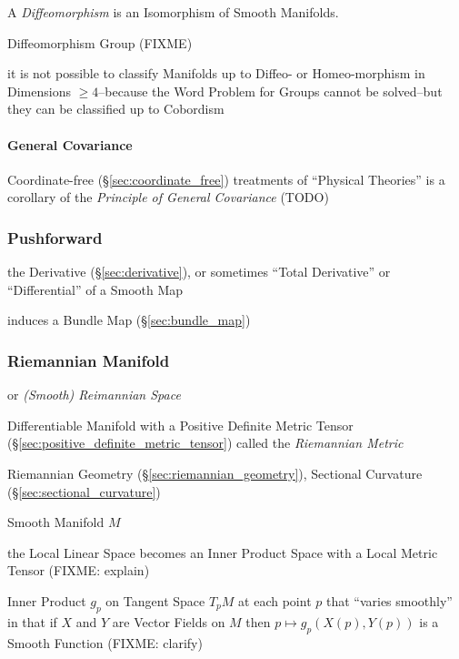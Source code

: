 A \emph{Diffeomorphism} is an Isomorphism of Smooth Manifolds.

Diffeomorphism Group (FIXME)

it is not possible to classify Manifolds up to Diffeo- or Homeo-morphism in
Dimensions $\geq 4$--because the Word Problem for Groups cannot be solved--but
they can be classified up to Cobordism




\paragraph{General Covariance}\label{sec:general_covariance}\hfill

Coordinate-free (\S\ref{sec:coordinate_free}) treatments of ``Physical
Theories'' is a corollary of the \emph{Principle of General Covariance} (TODO)



\subsubsection{Pushforward}\label{sec:pushforward}

the Derivative (\S\ref{sec:derivative}), or sometimes ``Total Derivative'' or
``Differential'' of a Smooth Map

induces a Bundle Map (\S\ref{sec:bundle_map})



\subsubsection{Riemannian Manifold}\label{sec:riemannian_manifold}


or \emph{(Smooth) Reimannian Space}

Differentiable Manifold with a Positive Definite Metric Tensor
(\S\ref{sec:positive_definite_metric_tensor}) called the
\emph{Riemannian Metric}

Riemannian Geometry (\S\ref{sec:riemannian_geometry}), Sectional Curvature
(\S\ref{sec:sectional_curvature})

Smooth Manifold $M$

the Local Linear Space becomes an Inner Product Space with a Local Metric Tensor
(FIXME: explain)

Inner Product $g_p$ on Tangent Space $T_pM$ at each point $p$ that
``varies smoothly'' in that if $X$ and $Y$ are Vector Fields on
$M$ then $p \mapsto g_p(X(p),Y(p))$ is a Smooth Function
(FIXME: clarify)

